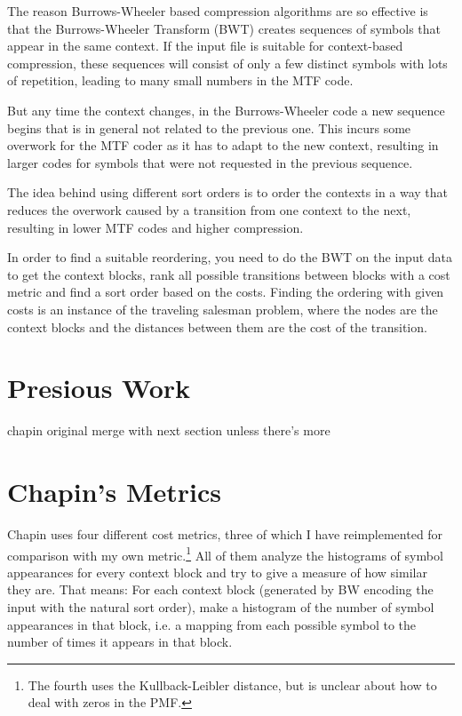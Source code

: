 \documentclass[a4paper]{scrreprt}
\begin{document}
The reason Burrows-Wheeler based compression algorithms are so effective is that
the Burrows-Wheeler Transform (BWT) creates sequences of symbols that appear in
the same context. If the input file is suitable for context-based
compression, these sequences will consist of only a few distinct symbols with
lots of repetition, leading to many small numbers in the MTF code.

But any time the context changes, in the Burrows-Wheeler code a new sequence
begins that is in general not related to the previous one. This incurs some
overwork\cite{bitner1979heuristics} for the MTF coder as it has to adapt to the
new context, resulting in larger codes for symbols that were not requested in
the previous sequence.


The idea behind using different sort orders is to order the contexts in a way
that reduces the overwork caused by a transition from one context to the next,
resulting in lower MTF codes and higher compression.

In order to find a suitable reordering, you need to do the BWT on the input data
to get the context blocks, rank all possible transitions between blocks with a
cost metric and find a sort order based on the costs. Finding the ordering with
given costs is an instance of the traveling salesman problem, where the nodes
are the context blocks and the distances between them are the cost of the
transition.

\section{Presious Work}

chapin original \cite{chapin1998sort,chapin2001diss}
merge with next section unless there's more

\section{Chapin's Metrics}


Chapin uses four different cost metrics, three of which I have reimplemented for
comparison with my own metric.\footnote{The fourth uses the Kullback-Leibler
distance, but is unclear about how to deal with zeros in the PMF.} All of them
analyze the histograms of symbol appearances for every context block and try to
give a measure of how similar they are. That means: For each context block
(generated by BW encoding the input with the natural sort order), make a
histogram of the number of symbol appearances in that block, i.e.
a mapping from each possible symbol to the number of times it appears in that
block.
\end{document}
